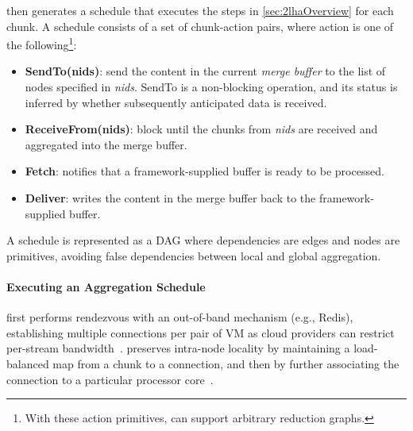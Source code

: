 \ha then generates a schedule that executes the steps in \textsection \ref{sec:2lhaOverview} for each chunk. A schedule consists of a set of chunk-action pairs, where action is one of the following\footnote{With these action primitives, \ha can support arbitrary reduction graphs.}:
\begin{itemize}[noitemsep,topsep=0pt,parsep=0pt,partopsep=0pt]
    \item \textbf{SendTo(nids)}: send the content in the current \textit{merge buffer} to the list of nodes specified in \textit{nids}. SendTo is a non-blocking operation, and its status is inferred by whether subsequently anticipated data is received.
    \item \textbf{ReceiveFrom(nids)}: block until the chunks from \textit{nids} are received and aggregated into the merge buffer.
    \item \textbf{Fetch}: notifies \ha that a framework-supplied buffer is ready to be processed.%
    \item \textbf{Deliver}: writes the content in the merge buffer back to the framework-supplied buffer. %
\end{itemize}

A schedule is represented as a DAG where dependencies are edges and nodes are primitives, avoiding false dependencies between local and global aggregation.

\paragraph{Executing an Aggregation Schedule}
\label{sec:2lhae}

\ha first performs rendezvous with an out-of-band mechanism (e.g., Redis), establishing multiple connections per pair of VM as cloud providers can restrict per-stream bandwidth~\cite{Placemen48:online}. \ha preserves intra-node locality by maintaining a load-balanced map from a chunk to a connection, and then by further associating the connection to a particular processor core~\cite{Pesterev:2012:INC:2168836.2168870}.

